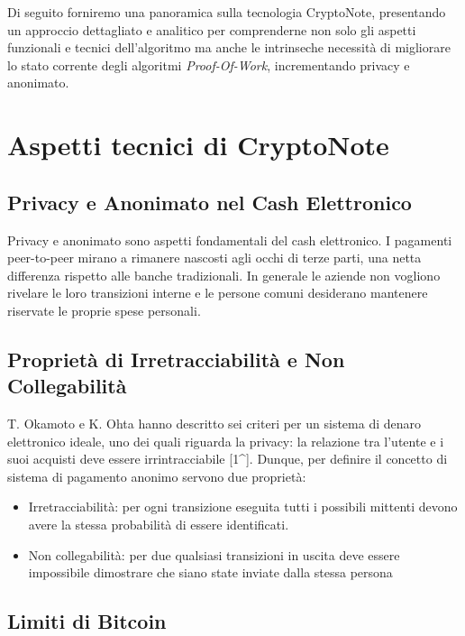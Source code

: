 Di seguito forniremo una panoramica sulla tecnologia CryptoNote,
presentando un approccio dettagliato e analitico per comprenderne non
solo gli aspetti funzionali e tecnici dell'algoritmo ma anche le
intrinseche necessità di migliorare lo stato corrente degli algoritmi
\emph{Proof-Of-Work}, incrementando privacy e anonimato.

\section{Aspetti tecnici di
CryptoNote}\label{aspetti-tecnici-di-cryptonote}

\subsection{Privacy e Anonimato nel Cash
Elettronico}\label{privacy-e-anonimato-nel-cash-elettronico}

Privacy e anonimato sono aspetti fondamentali del cash elettronico. I
pagamenti peer-to-peer mirano a rimanere nascosti agli occhi di terze
parti, una netta differenza rispetto alle banche tradizionali. In
generale le aziende non vogliono rivelare le loro transizioni interne e
le persone comuni desiderano mantenere riservate le proprie spese
personali.

\subsection{Proprietà di Irretracciabilità e Non
Collegabilità}\label{proprieta-di-irretracciabilita-e-non-collegabilita}

T. Okamoto e K. Ohta hanno descritto sei criteri per un sistema di
denaro elettronico ideale, uno dei quali riguarda la privacy: la
relazione tra l'utente e i suoi acquisti deve essere irrintracciabile
{[}1\^{}{]}. Dunque, per definire il concetto di sistema di pagamento
anonimo servono due proprietà:

\begin{itemize}
\item
  Irretracciabilità: per ogni transizione eseguita tutti i possibili
  mittenti devono avere la stessa probabilità di essere identificati.
\item
  Non collegabilità: per due qualsiasi transizioni in uscita deve essere
  impossibile dimostrare che siano state inviate dalla stessa persona
\end{itemize}

\subsection{Limiti di Bitcoin}\label{limiti-di-bitcoin}


